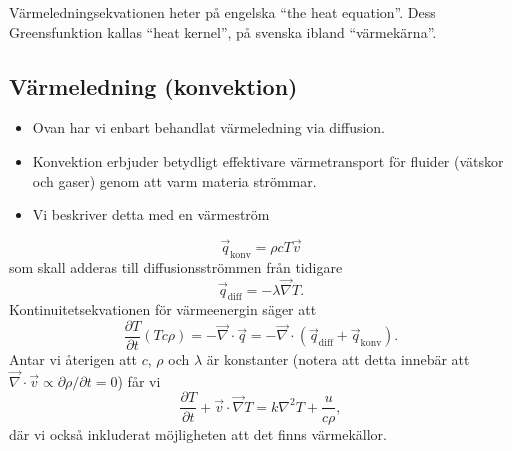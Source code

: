 \documentclass[%
oneside,                 %
final,                   %
10pt]{article}
\begin{document}
Värmeledningsekvationen heter på engelska ``the heat equation''. Dess Greensfunktion kallas ``heat kernel'', på svenska ibland ``värmekärna''.

\subsection{Värmeledning (konvektion)}

\begin{itemize}
\item Ovan har vi enbart behandlat värmeledning via diffusion.

\item Konvektion erbjuder betydligt effektivare värmetransport för fluider (vätskor och gaser) genom att varm materia strömmar.

\item Vi beskriver detta med en värmeström
\end{itemize}

\noindent
$$
\vec{q}_\mathrm{konv} = \rho c T \vec{v}
$$
som skall adderas till diffusionsströmmen från tidigare
$$
\vec{q}_\mathrm{diff} = - \lambda \vec{\nabla} T.
$$
Kontinuitetsekvationen för värmeenergin säger att 
$$
\frac{\partial  T}{\partial t} (T c \rho) = -\vec{\nabla} \cdot \vec{q} = -\vec{\nabla} \cdot (\vec{q}_\mathrm{diff} + \vec{q}_\mathrm{konv}).
$$
Antar vi återigen att $c$, $\rho$ och $\lambda$ är konstanter (notera att detta innebär att $\vec{\nabla} \cdot \vec{v} \propto \partial \rho / \partial t = 0$) får vi
\begin{equation}
  \frac{\partial T}{\partial t} + \vec{v} \cdot \vec{\nabla} T = k \nabla^2 T + \frac{u}{c\rho},
\end{equation}
där vi också inkluderat möjligheten att det finns värmekällor.



\printindex
\end{document}
